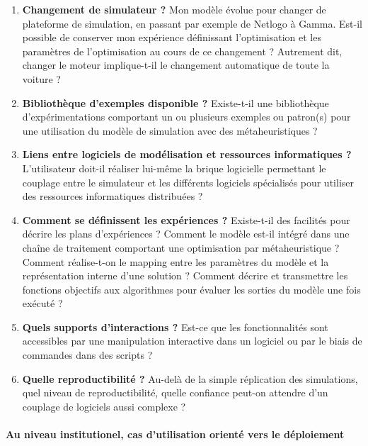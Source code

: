 \begin{enumerate}

	\item{\textbf{Changement de simulateur ?}} Mon modèle évolue pour changer de plateforme de simulation, en passant par exemple de Netlogo à Gamma. Est-il possible de conserver mon expérience définissant l'optimisation et les paramètres de l'optimisation au cours de ce changement ? Autrement dit, changer le moteur implique-t-il le changement automatique de toute la voiture ?

	\item{\textbf{Bibliothèque d'exemples disponible ?}} Existe-t-il une bibliothèque d'expérimentations comportant un ou plusieurs exemples ou patron(s) pour une utilisation du modèle de simulation avec des métaheuristiques ?

	\item{\textbf{Liens entre logiciels de modélisation et ressources informatiques ?}} L'utilisateur doit-il réaliser lui-même la brique logicielle permettant le couplage entre le simulateur et les différents logiciels spécialisés pour utiliser des ressources informatiques distribuées ?

	\item{\textbf{Comment se définissent les expériences ?}} Existe-t-il des facilités pour décrire les plans d'expériences ? Comment le modèle est-il intégré dans une chaîne de traitement comportant une optimisation par métaheuristique ? Comment réalise-t-on le mapping entre les paramètres du modèle et la représentation interne d'une solution ? Comment décrire et transmettre les fonctions objectifs aux algorithmes pour évaluer les sorties du modèle une fois exécuté ?

	\item{\textbf{Quels supports d'interactions ?}} Est-ce que les fonctionnalités sont accessibles par une manipulation interactive dans un logiciel ou par le biais de commandes dans des scripts ?

	\item{\textbf{Quelle reproductibilité ?}} Au-delà de la simple réplication des simulations, quel niveau de reproductibilité, quelle confiance peut-on attendre d'un couplage de logiciels aussi complexe ?

\end{enumerate}

\paragraph{Au niveau institutionel, cas d'utilisation orienté vers le déploiement }

